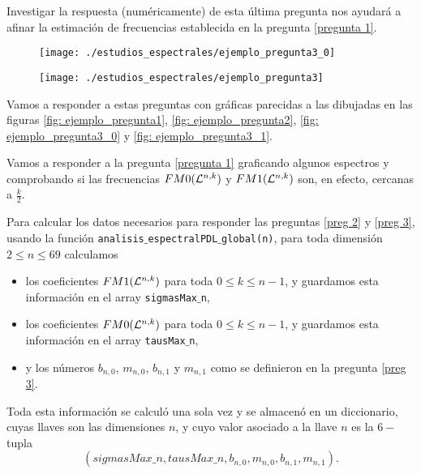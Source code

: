 Investigar la respuesta (numéricamente)
de esta última pregunta nos ayudará a afinar 
la estimación de frecuencias establecida
en la pregunta \ref{pregunta 1}. 

\begin{figure}[H]
	\centering
	\texttt{[image: ./estudios\_espectrales/ejemplo\_pregunta3\_0]} 
\end{figure}	

\begin{figure}[H]
	\centering
	\texttt{[image: ./estudios\_espectrales/ejemplo\_pregunta3]} 
\end{figure}	


Vamos a responder a estas preguntas con gráficas parecidas
a las dibujadas en las figuras
\ref{fig: ejemplo_pregunta1},
\ref{fig: ejemplo_pregunta2},
\ref{fig: ejemplo_pregunta3_0} y
\ref{fig: ejemplo_pregunta3_1}.

Vamos a responder a la pregunta \ref{pregunta 1} graficando
algunos espectros y comprobando si las
frecuencias $FM0(\mathcal{L}^{n,k})$ y 
$FM1(\mathcal{L}^{n,k})$ son, en efecto, cercanas a $\frac{k}{2}$.

Para calcular los datos necesarios para responder
las preguntas \ref{preg 2} y \ref{preg 3},
usando la función \texttt{analisis$\_$espectralPDL$\_$global(n)}, 
para toda dimensión
$2 \leq n \leq 69$ calculamos
\begin{itemize}
	\item los coeficientes $FM1(\mathcal{L}^{n,k})$ para toda
	$0 \leq k \leq n-1$, y guardamos esta información en el
	array \texttt{sigmasMax$\_$n},
	\item los coeficientes $FM0(\mathcal{L}^{n,k})$ para toda
	$0 \leq k \leq n-1$, y guardamos esta información en el
	array \texttt{tausMax$\_$n},
	\item y los números $b_{n,0}$, $m_{n,0}$,
	$b_{n,1}$ y $m_{n,1}$ como se definieron en la pregunta
	\ref{preg 3}.
\end{itemize}
Toda esta información se calculó una sola vez y se almacenó
en un diccionario, cuyas llaves son las dimensiones
$n$, y cuyo valor asociado a la llave $n$ es la $6-$tupla
\[
(sigmasMax\_n, tausMax\_n, b_{n,0}, m_{n,0}, b_{n,1}, m_{n,1}).
\]

